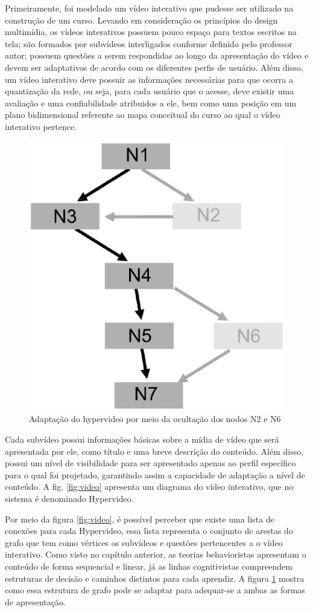 Primeiramente, foi modelado um vídeo interativo que pudesse ser utilizado na construção de um curso. Levando em consideração os princípios do design multimídia, os vídeos interativos possuem pouco espaço para textos escritos na tela; são formados por subvídeos interligados conforme definido pelo professor autor; possuem questões a serem respondidas ao longo da apresentação do vídeo e devem ser adaptativos de acordo com os diferentes perfis de usuário. Além disso, um vídeo interativo deve possuir as informações necessárias para que ocorra a quantização da rede, ou seja, para cada usuário que o acesse, deve existir uma avaliação e uma confiabilidade atribuidos a ele, bem como uma posição em um plano bidimensional referente ao mapa conceitual do curso ao qual o vídeo interativo pertence. 

\begin{figure}[h!]
	\centering
  	\includegraphics[width=.3\linewidth]{figuras/estrutura.eps}
  	\caption{Adaptação do hypervideo por meio da ocultação dos nodos N2 e N6}
  	\label{fig:estrutura}
\end{figure}

Cada subvídeo possui informações básicas sobre a mídia de vídeo que será apresentada por ele, como título e uma breve descrição do conteúdo. Além disso, possui um nível de visibilidade para ser apresentado apenas ao perfil específico para o qual foi projetado, garantindo assim a capacidade de adaptação a nível de conteúdo. A fig. \ref{fig:video} apresenta um diagrama do vídeo interativo, que no sistema é denominado Hypervideo.

Por meio da figura \ref{fig:video}, é possível perceber que existe uma lista de conexões para cada Hypervideo, essa lista representa o conjunto de arestas do grafo que tem como vértices os subvídeos e questões pertencentes a o vídeo interativo. Como visto no capítulo anterior, as teorias behavioristas apresentam o conteúdo de forma sequencial e linear, já as linhas cognitivistas compreendem estruturas de decisão e caminhos distintos para cada aprendiz. A figura \ref{fig:estrutura} mostra como essa estrutura de grafo pode se adaptar para adequar-se a ambas as formas de apresentação.


